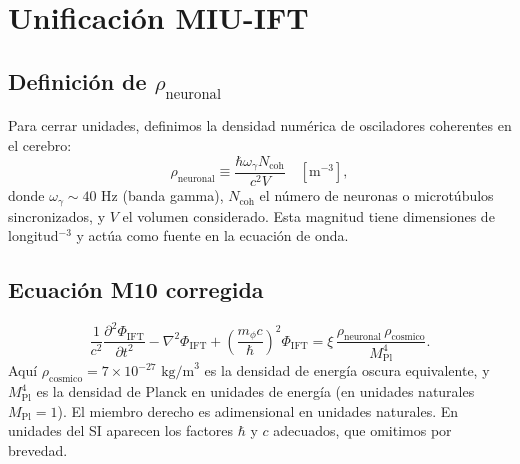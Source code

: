 \documentclass[12pt, a4paper]{article}
\theoremstyle{miuThm}
\theoremstyle{remark}
\newcommand{\MPl}{M_{\text{Pl}}}
\begin{document}
\clearpage
\section{Unificación MIU-IFT}
\label{sec:unificacion}

\subsection{Definición de $\rho_{\text{neuronal}}$}
Para cerrar unidades, definimos la densidad numérica de osciladores coherentes en el cerebro:
\begin{equation}
\rho_{\text{neuronal}} \equiv \frac{\hbar \omega_\gamma N_{\text{coh}}}{c^2 V} \quad [\text{m}^{-3}],
\end{equation}
donde $\omega_\gamma \sim 40$ Hz (banda gamma), $N_{\text{coh}}$ el número de neuronas o microtúbulos sincronizados, y $V$ el volumen considerado. Esta magnitud tiene dimensiones de longitud$^{-3}$ y actúa como fuente en la ecuación de onda.

\subsection{Ecuación M10 corregida}
\begin{equation}
\boxed{
\frac{1}{c^2}\frac{\partial^2 \Phi_{\text{IFT}}}{\partial t^2} - \nabla^2 \Phi_{\text{IFT}} + \left(\frac{m_\phi c}{\hbar}\right)^2 \Phi_{\text{IFT}} = \xi \, \frac{\rho_{\text{neuronal}} \, \rho_{\text{cosmico}}}{\MPl^4}
}.
\end{equation}
Aquí $\rho_{\text{cosmico}} = 7\times10^{-27}\text{ kg/m}^3$ es la densidad de energía oscura equivalente, y $M_{\text{Pl}}^4$ es la densidad de Planck en unidades de energía (en unidades naturales $M_{\text{Pl}}=1$). El miembro derecho es adimensional en unidades naturales. En unidades del SI aparecen los factores $\hbar$ y $c$ adecuados, que omitimos por brevedad.
\end{document}
